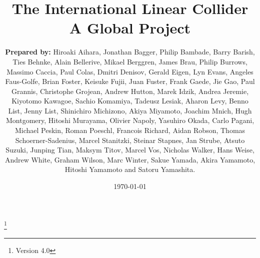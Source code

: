 \documentclass[%
 reprint,
 amsmath,amssymb,
 aps,
]{revtex4-1}
\begin{document}

\title{The International Linear Collider \\ A Global Project}%
\thanks{Version 4.0}%

\author{\textbf{Prepared by:}
Hiroaki Aihara, Jonathan Bagger, Philip Bambade, Barry Barish,  Ties Behnke, Alain Bellerive, Mikael Berggren, James Brau, Philip Burrows, Massimo Caccia, Paul Colas, Dmitri Denisov, Gerald Eigen, Lyn Evans, Angeles Faus-Golfe, Brian Foster, Keisuke Fujii, Juan Fuster, Frank Gaede, Jie Gao, Paul Grannis, Christophe Grojean, Andrew Hutton, Marek Idzik, Andrea Jeremie, Kiyotomo Kawagoe, Sachio Komamiya, Tadeusz Lesiak, Aharon Levy, Benno List, Jenny List, Shinichiro Michizono, Akiya Miyamoto, Joachim Mnich, Hugh Montgomery, Hitoshi Murayama, Olivier Napoly, Yasuhiro Okada, Carlo Pagani, Michael Peskin, Roman Poeschl, Francois Richard, Aidan Robson, Thomas Schoerner-Sadenius, Marcel Stanitzki, Steinar Stapnes, Jan Strube, Atsuto Suzuki, Junping Tian, Maksym Titov, Marcel Vos, Nicholas Walker, Hans Weise, Andrew White, Graham Wilson, Marc Winter, Sakue Yamada, Akira Yamamoto, Hitoshi Yamamoto and Satoru Yamashita. }
%


\date{\today}%
\end{document}
